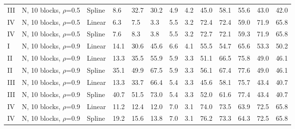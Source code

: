 \documentclass{article}\usepackage[]{graphicx}\usepackage[]{color}
\begin{document}
\begin{table}[ht]
\begin{tabular}{lll|lllll|lllll}
  III & N, 10 blocks, $\rho$=0.5 & Spline & 8.6 & 32.7 & 30.2 & 4.9 & 4.2 & 45.0 & 58.1 & 55.6 & 43.0 & 42.0 \\ 
  IV & N, 10 blocks, $\rho$=0.5 & Linear & 6.3 & 7.5 & 3.3 & 5.5 & 3.2 & 72.4 & 72.4 & 59.0 & 71.9 & 65.8 \\ 
  IV & N, 10 blocks, $\rho$=0.5 & Spline & 7.6 & 8.3 & 3.8 & 5.5 & 3.2 & 72.7 & 72.1 & 59.3 & 71.9 & 65.8 \\ 
   \hline
I & N, 10 blocks, $\rho$=0.9 & Linear & 14.1 & 30.6 & 45.6 & 6.6 & 4.1 & 55.5 & 54.7 & 65.6 & 53.3 & 50.2 \\ 
  II & N, 10 blocks, $\rho$=0.9 & Linear & 13.3 & 35.5 & 55.9 & 5.9 & 3.3 & 51.1 & 66.5 & 75.8 & 49.0 & 46.1 \\ 
  II & N, 10 blocks, $\rho$=0.9 & Spline & 35.1 & 49.9 & 67.5 & 5.9 & 3.3 & 56.1 & 67.4 & 77.6 & 49.0 & 46.1 \\ 
  III & N, 10 blocks, $\rho$=0.9 & Linear & 13.3 & 33.7 & 66.4 & 5.4 & 3.3 & 45.6 & 58.1 & 75.7 & 43.4 & 40.7 \\ 
  III & N, 10 blocks, $\rho$=0.9 & Spline & 40.7 & 51.5 & 73.0 & 5.4 & 3.3 & 52.0 & 61.6 & 77.4 & 43.4 & 40.7 \\ 
  IV & N, 10 blocks, $\rho$=0.9 & Linear & 11.2 & 12.4 & 12.0 & 7.0 & 3.1 & 74.0 & 73.5 & 63.9 & 72.5 & 65.8 \\ 
  IV & N, 10 blocks, $\rho$=0.9 & Spline & 19.2 & 15.6 & 13.8 & 7.0 & 3.1 & 76.2 & 73.3 & 64.3 & 72.5 & 65.8 \\ 
   \hline
\end{tabular}
\end{table}
\end{document}
